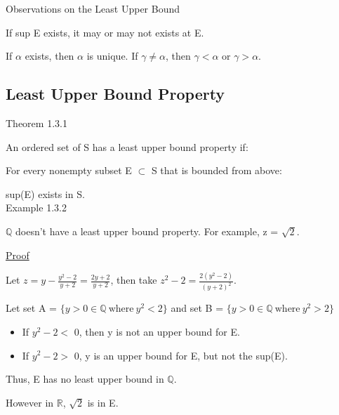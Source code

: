 { \color{green} Observations on the Least Upper Bound }

\qquad If sup E exists, it may or may not exists at E.

\qquad If $ \alpha $ exists, then $ \alpha $ is unique.
If $ \gamma \neq \alpha $, then $ \gamma < \alpha $ or $ \gamma > \alpha $. \\





\subsection{Least Upper Bound Property}

{ \color{red} Theorem 1.3.1 }

\qquad An ordered set of S has a least upper bound property if:

\qquad \qquad For every nonempty subset E $ \subset $ S that is bounded from above:

\qquad \qquad \qquad sup(E) exists in S. \\

{ \color{purple} Example 1.3.2 }

\qquad $ \mathbb{Q} $ doesn't have a least upper bound property. For example, z = $ \sqrt{2} $.

{\color{magenta} \underline{Proof}}

Let $ z = y - \frac{y^2-2}{y+2} = \frac{2y+2}{y+2} $, then take $ z^2-2 = \frac{2(y^2-2)}{(y+2)^2} $.

Let set A = $ \{ y > 0 \in \mathbb{Q} \ \text{where} \ y^2 < 2 \} $ and
set B = $ \{ y > 0 \in \mathbb{Q} \ \text{where} \ y^2 > 2 \} $

\begin{itemize}[leftmargin=2cm]
	\item If $ y^2-2 < $ 0, then y is not an upper bound for E.
	
	\item If $ y^2-2 > $ 0, y is an upper bound for E, but not the sup(E).
\end{itemize}

Thus, E has no least upper bound in $ \mathbb{Q} $.

However in $ \mathbb{R} $, $ \sqrt{2} $ is in E.
